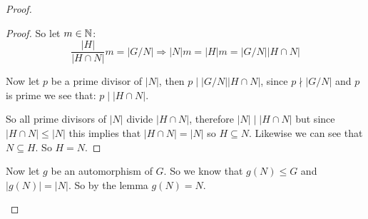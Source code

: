 \begin{exercise}
\begin{proof}
\begin{enumerate}[label = (\alph*)]
\begin{lemma}
\begin{proof}
                    So let $m\in \mathbb{N}$:\[
                        \frac{|H|}{|H\cap N|}m = |G/N| \Rightarrow |N|m = |H|m = |G/N||H\cap N|
                    \]

                    Now let $p$ be a prime divisor of $|N|$, then $p\mid |G/N||H\cap N|$, since $p\nmid |G/N|$ and $p$ is prime we see that: $p\mid |H\cap N|$.

                    So all prime divisors of $|N|$ divide $|H\cap N|$, therefore $|N|\mid |H\cap N|$ but since $|H\cap N|\leq |N|$ this implies that $|H\cap N| = |N|$ so $H\subseteq N$. Likewise we can see that $N\subseteq H$. So $H = N$.
                \end{proof}
            \end{lemma}

            Now let $g$ be an automorphism of $G$. So we know that $g(N)\leq G$ and $|g(N)| = |N|$. So by the lemma $g(N) = N$. 
        \end{enumerate}
    \end{proof}
\end{exercise}
